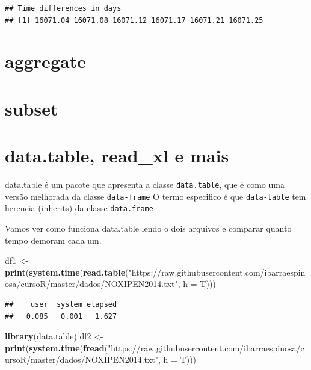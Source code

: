 \documentclass[]{book}
\newenvironment{Shaded}{\begin{snugshade}}{\end{snugshade}}
\newcommand{\KeywordTok}[1]{\textcolor[rgb]{0.13,0.29,0.53}{\textbf{#1}}}
\newcommand{\DataTypeTok}[1]{\textcolor[rgb]{0.13,0.29,0.53}{#1}}
\newcommand{\StringTok}[1]{\textcolor[rgb]{0.31,0.60,0.02}{#1}}
\newcommand{\NormalTok}[1]{#1}
\theoremstyle{definition}
\theoremstyle{definition}
\theoremstyle{definition}
\theoremstyle{remark}
\begin{document}
\begin{verbatim}
## Time differences in days
## [1] 16071.04 16071.08 16071.12 16071.17 16071.21 16071.25
\end{verbatim}

\section{aggregate}\label{aggregate}

\section{subset}\label{subset}

\section{data.table, read\_xl e mais}\label{data.table-read_xl-e-mais}

data.table é um pacote que apresenta a classe \texttt{data.table}, que é
como uma versão melhorada da classe \texttt{data-frame} O termo
especifico é que \texttt{data-table} tem herencia (inherits) da classe
\texttt{data.frame}

Vamos ver como funciona data.table lendo o dois arquivos e comparar
quanto tempo demoram cada um.

\begin{Shaded}
\begin{Highlighting}[]
\NormalTok{df1 <-}\StringTok{ }\KeywordTok{print}\NormalTok{(}\KeywordTok{system.time}\NormalTok{(}\KeywordTok{read.table}\NormalTok{(}\StringTok{"https://raw.githubusercontent.com/ibarraespinosa/cursoR/master/dados/NOXIPEN2014.txt"}\NormalTok{, }\DataTypeTok{h =}\NormalTok{ T)))}
\end{Highlighting}
\end{Shaded}

\begin{verbatim}
##    user  system elapsed 
##   0.085   0.001   1.627
\end{verbatim}

\begin{Shaded}
\begin{Highlighting}[]
\KeywordTok{library}\NormalTok{(data.table)}
\NormalTok{df2 <-}\StringTok{ }\KeywordTok{print}\NormalTok{(}\KeywordTok{system.time}\NormalTok{(}\KeywordTok{fread}\NormalTok{(}\StringTok{"https://raw.githubusercontent.com/ibarraespinosa/cursoR/master/dados/NOXIPEN2014.txt"}\NormalTok{, }\DataTypeTok{h =}\NormalTok{ T)))}
\end{Highlighting}
\end{Shaded}
\end{document}
